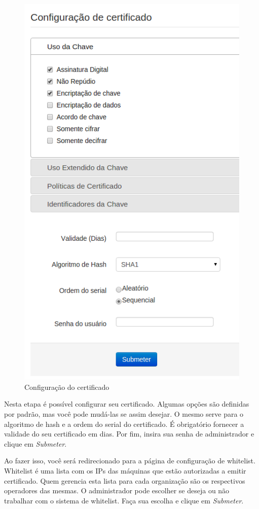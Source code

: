     \begin{figure}[ht]
     \centering
     \includegraphics[scale=0.5]{images/configcertificado.png}
     \caption{Configuração do certificado}
     \label{fig:configcertificado}
\end{figure}

    Nesta etapa é possível configurar seu certificado. Algumas opções são definidas por padrão, mas você pode mudá-las se assim desejar. O mesmo serve para o algoritmo de hash e a ordem do serial do certificado. É obrigatório fornecer a validade do seu certificado em dias. Por fim, insira sua senha de administrador e clique em \textit{Submeter}.
    
    Ao fazer isso, você será redirecionado para a página de configuração de whitelist. Whitelist é uma lista com os IPs das máquinas que estão autorizadas a emitir certificado. Quem gerencia esta lista para cada organização são os respectivos operadores das mesmas. O administrador pode escolher se deseja ou não trabalhar com o sistema de whitelist. Faça sua escolha e clique em \textit{Submeter}.
    
